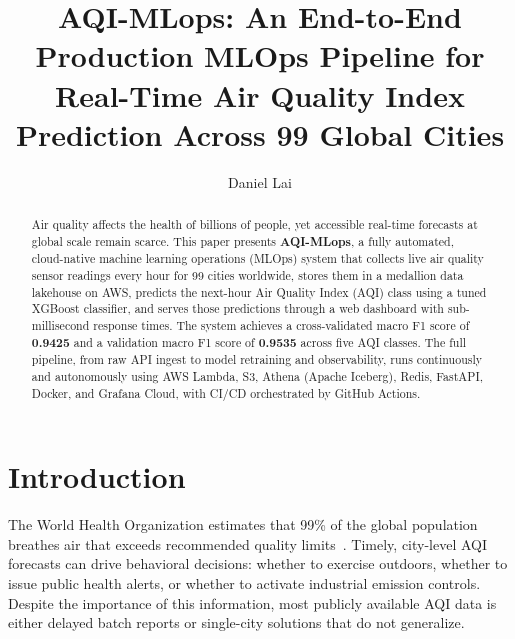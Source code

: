 \documentclass[sigconf, nonacm]{acmart}
\begin{document}
\title{AQI-MLops: An End-to-End Production MLOps Pipeline
       for Real-Time Air Quality Index Prediction
       Across 99 Global Cities}

\author{Daniel Lai}

\begin{abstract}
Air quality affects the health of billions of people, yet
accessible real-time forecasts at global scale remain scarce.
This paper presents \textbf{AQI-MLops}, a fully automated,
cloud-native machine learning operations (MLOps) system that
collects live air quality sensor readings every hour for
99 cities worldwide, stores them in a medallion data lakehouse
on AWS, predicts the next-hour Air Quality Index (AQI) class
using a tuned XGBoost classifier, and serves those predictions
through a web dashboard with sub-millisecond response times.
The system achieves a cross-validated macro F1 score of
\textbf{0.9425} and a validation macro F1 score of
\textbf{0.9535} across five AQI classes.  The full pipeline,
from raw API ingest to model retraining and observability,
runs continuously and autonomously using AWS Lambda, S3,
Athena (Apache Iceberg), Redis, FastAPI, Docker, and Grafana
Cloud, with CI/CD orchestrated by GitHub Actions.
\end{abstract}


\maketitle

\section{Introduction}

The World Health Organization estimates that 99\% of the
global population breathes air that exceeds recommended
quality limits~\cite{who2021}.  Timely, city-level AQI
forecasts can drive behavioral decisions: whether to
exercise outdoors, whether to issue public health alerts,
or whether to activate industrial emission controls.
Despite the importance of this information, most publicly
available AQI data is either delayed batch reports or
single-city solutions that do not generalize.
\end{document}
